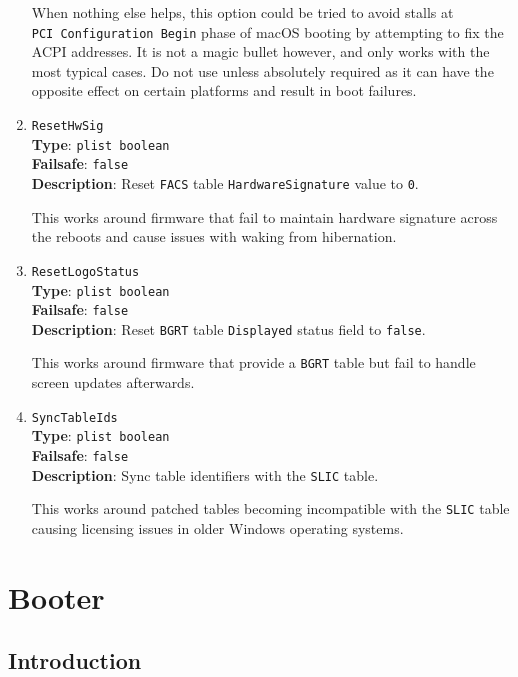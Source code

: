 \documentclass[]{article}
\begin{document}
\begin{enumerate}
  When nothing else helps, this option could be tried to avoid stalls at
  \texttt{PCI\ Configuration\ Begin} phase of macOS booting by attempting to fix
  the ACPI addresses. It is not a magic bullet however, and only works with the
  most typical cases. Do not use unless absolutely required as it can have the
  opposite effect on certain platforms and result in boot failures.

\item
  \texttt{ResetHwSig}\\
  \textbf{Type}: \texttt{plist\ boolean}\\
  \textbf{Failsafe}: \texttt{false}\\
  \textbf{Description}: Reset \texttt{FACS} table \texttt{HardwareSignature}
  value to \texttt{0}.

  This works around firmware that fail to maintain hardware signature across
  the reboots and cause issues with waking from hibernation.

\item
  \texttt{ResetLogoStatus}\\
  \textbf{Type}: \texttt{plist\ boolean}\\
  \textbf{Failsafe}: \texttt{false}\\
  \textbf{Description}: Reset \texttt{BGRT} table \texttt{Displayed}
  status field to \texttt{false}.

  This works around firmware that provide a \texttt{BGRT} table but
  fail to handle screen updates afterwards.

\item
  \texttt{SyncTableIds}\\
  \textbf{Type}: \texttt{plist\ boolean}\\
  \textbf{Failsafe}: \texttt{false}\\
  \textbf{Description}: Sync table identifiers with the \texttt{SLIC} table.

  This works around patched tables becoming incompatible with the \texttt{SLIC}
  table causing licensing issues in older Windows operating systems.

\end{enumerate}


\section{Booter}\label{booter}

\subsection{Introduction}\label{booterintro}
\end{document}
